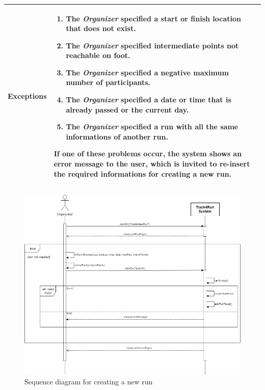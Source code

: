 \begin{table}[H]
\begin{tabular}{|p{3.5cm}|p{10.3cm}|}
    \hline
    \textbf{\large{Exceptions}} 		& \begin{enumerate}[leftmargin=0.5cm]
                                          	\item The \emph{Organizer} specified a start or finish location that does not exist.
                                            \item The \emph{Organizer} specified intermediate points not reachable on foot.
                                             \item The \emph{Organizer} specified a negative maximum number of participants.
                                            \item The \emph{Organizer} specified a date or time that is already passed or the current day.
                                            \item The \emph{Organizer} specified a run with all the same informations of another run.
                                          \end{enumerate}
    										If one of these problems occur, the system shows an error message to the user, which is invited to re-insert the required informations for creating a new run.\\
    
    \hline
    
    \end{tabular}
	
\end{table}

\begin{figure}[H]
    \centering
    \includegraphics[scale=0.4]{Pictures/createNewRunSeqDiag.png}
    \caption{Sequence diagram for creating a new run}
\end{figure}
